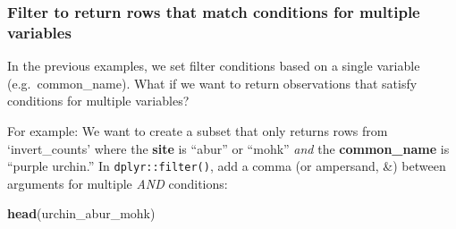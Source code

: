 \documentclass[]{book}
\newenvironment{Shaded}{\begin{snugshade}}{\end{snugshade}}
\newcommand{\KeywordTok}[1]{\textcolor[rgb]{0.13,0.29,0.53}{\textbf{#1}}}
\newcommand{\NormalTok}[1]{#1}
\newcommand{\OperatorTok}[1]{\textcolor[rgb]{0.81,0.36,0.00}{\textbf{#1}}}
\newcommand{\StringTok}[1]{\textcolor[rgb]{0.31,0.60,0.02}{#1}}
\begin{document}
\begin{Shaded}
\end{Shaded}

\hypertarget{filter-to-return-rows-that-match-conditions-for-multiple-variables}{%
\subsubsection{Filter to return rows that match conditions for multiple variables}\label{filter-to-return-rows-that-match-conditions-for-multiple-variables}}

In the previous examples, we set filter conditions based on a single variable (e.g.~common\_name). What if we want to return observations that satisfy conditions for multiple variables?

For example: We want to create a subset that only returns rows from `invert\_counts' where the \textbf{site} is ``abur'' or ``mohk'' \emph{and} the \textbf{common\_name} is ``purple urchin.'' In \texttt{dplyr::filter()}, add a comma (or ampersand, \&) between arguments for multiple \emph{AND} conditions:

\begin{Shaded}
\end{Shaded}

\begin{Shaded}
\begin{Highlighting}[]
\KeywordTok{head}\NormalTok{(urchin_abur_mohk)}
\end{Highlighting}
\end{Shaded}
\end{document}
